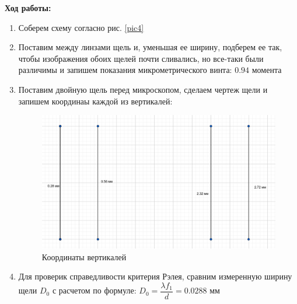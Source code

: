 \documentclass[a4paper, 12pt]{article}
\begin{document}
\textbf{Ход работы:}

\begin{enumerate}
    \item Соберем схему согласно рис. \ref{pic4}
    \item Поставим между линзами щель и, уменьшая ее ширину, подберем ее так, чтобы изображения обоих щелей почти сливались, но все-таки были различимы и запишем показания микрометрического винта: $0.94$ момента
    \item Поставим двойную щель перед микроскопом, сделаем чертеж щели и запишем координаы каждой из вертикалей:
    
    \begin{figure}[!h]
        \centering
        \includegraphics[scale=0.3]{pic5.png}
        \caption{Координаты вертикалей}
        \label{pic5}
    \end{figure}

    \item Для проверик справедливости критерия Рэлея, сравним измеренную ширину щели $D_0$ с расчетом по формуле: $D_0 = \dfrac{\lambda f_1}{d} = 0.0288$ мм
\end{enumerate}
\end{document}
